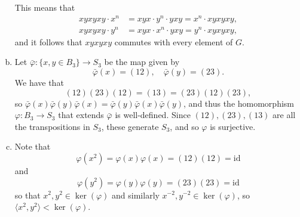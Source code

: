 \documentclass{article}
\begin{document}
\begin{Answer}
\begin{enumerate}[(a)]
{    This means that
    \begin{align*}
        xyxyxy \cdot x^n
     &= xyx \cdot y^n \cdot yxy
      = x^n \cdot xyxyxy, \\
        xyxyxy \cdot y^n
     &= xyx \cdot x^n \cdot yxy
      = y^n \cdot xyxyxy,
    \end{align*}
    and it follows that $xyxyxy$ commutes with every element of $G$.
  }
  \item{
    Let $\bar{\varphi} : \{ x, y \in B_3 \} \to S_3$ be the map given by
    $$
    \bar{\varphi}(x) = (12), \quad
    \bar{\varphi}(y) = (23).
    $$
    We have that
    $$
    (12)(23)(12) = (13) = (23)(12)(23),
    $$
    so
    $\bar{\varphi}(x)\bar{\varphi}(y)\bar{\varphi}(x) = \bar{\varphi}(y)\bar{\varphi}(x)\bar{\varphi}(y)$,
    and thus the
    homomorphism $\varphi : B_3 \to S_3$ that extends $\bar{\varphi}$
    is well-defined.  Since $(12), (23), (13)$ are all the
    transpositions in $S_3$, these generate $S_3$,
    and so $\varphi$ is surjective.
  }
  \item{
    Note that
    $$
    \varphi(x^2) = \varphi(x)\varphi(x) = (12)(12) = \mathrm{id}
    $$
    and
    $$
    \varphi(y^2) = \varphi(y)\varphi(y) = (23)(23) = \mathrm{id}
    $$
    so that $x^2, y^2 \in \ker(\varphi)$ and similarly
    $x^{-2}, y^{-2} \in \ker(\varphi)$, so
    $\langle x^2, y^2 \rangle < \ker(\varphi)$.

}
\end{enumerate}
\end{Answer}
\end{document}
